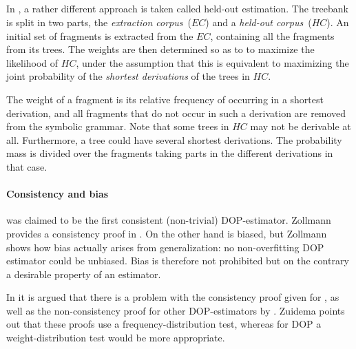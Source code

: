 \subsection{\dops}
In \dops{} \cite{zollmann2005}, a rather different approach is taken called held-out estimation. The treebank is split in two parts, the \emph{extraction corpus}~($EC$) and a \emph{held-out corpus}~($HC$). An initial set of fragments is extracted from the $EC$, containing all the fragments from its trees. The weights are then determined so as to to maximize the likelihood of $HC$, under the assumption that this is equivalent to maximizing the joint probability of the \emph{shortest derivations} of the trees in $HC$. 

The weight of a fragment is its relative frequency of occurring in a shortest derivation, and all fragments that do not occur in such a derivation are removed from the symbolic grammar. Note that some trees in $HC$ may not be derivable at all. Furthermore, a tree could have several shortest derivations. The probability mass is divided over the fragments taking parts in the different derivations in that case.

\paragraph{Consistency and bias}
\dops{} was claimed to be the first consistent (non-trivial) DOP-estimator. Zollmann provides a consistency proof in \cite{zollmann2005}. On the other hand \dops{} is  biased, but Zollmann shows how bias actually arises from generalization: no non-overfitting DOP estimator could be unbiased. Bias is therefore not prohibited but on the contrary a desirable property of an estimator.

In \cite{zuidema2006} it is argued that there is a problem with the consistency proof given for \dops{}, as well as the non-consistency proof for other DOP-estimators by \cite{johnson2002}. Zuidema points out that these proofs use a frequency-distribution test, whereas for DOP a weight-distribution test would be more appropriate. 






















